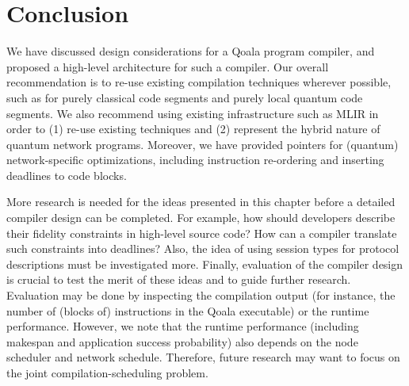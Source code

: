 \section{Conclusion}
We have discussed design considerations for a Qoala program compiler, and proposed a high-level architecture for such a compiler.
Our overall recommendation is to re-use existing compilation techniques wherever possible, such as for purely classical code segments and purely local quantum code segments.
We also recommend using existing infrastructure such as MLIR in order to (1) re-use existing techniques and (2) represent the hybrid nature of quantum network programs.
Moreover, we have provided pointers for (quantum) network-specific optimizations, including instruction re-ordering and inserting deadlines to code blocks.

More research is needed for the ideas presented in this chapter before a detailed compiler design can be completed.
For example, how should developers describe their fidelity constraints in high-level source code?
How can a compiler translate such constraints into deadlines?
Also, the idea of using session types for protocol descriptions must be investigated more.
Finally, evaluation of the compiler design is crucial to test the merit of these ideas and to guide further research.
Evaluation may be done by inspecting the compilation output (for instance, the number of (blocks of) instructions in the Qoala executable) or the runtime performance.
However, we note that the runtime performance (including makespan and application success probability) also depends on the node scheduler and network schedule.
Therefore, future research may want to focus on the joint compilation-scheduling problem.
